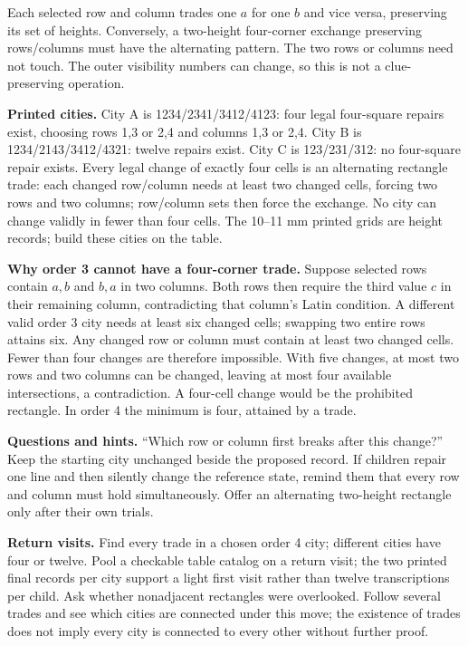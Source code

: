 \documentclass[11pt]{article}
\begin{document}
Each selected row and column trades one $a $ for one $b $ and vice versa, preserving its set of heights. Conversely, a two-height four-corner exchange preserving rows/columns must have the alternating pattern. The two rows or columns need not touch. The outer visibility numbers can change, so this is not a clue-preserving operation.

\textbf{Printed cities.} City A is 1234/2341/3412/4123: four legal four-square repairs exist, choosing rows 1,3 or 2,4 and columns 1,3 or 2,4. City B is 1234/2143/3412/4321: twelve repairs exist. City C is 123/231/312: no four-square repair exists. Every legal change of exactly four cells is an alternating rectangle trade: each changed row/column needs at least two changed cells, forcing two rows and two columns; row/column sets then force the exchange. No city can change validly in fewer than four cells. The 10--11 mm printed grids are height records; build these cities on the table.

\textbf{Why order 3 cannot have a four-corner trade.} Suppose selected rows contain $a,b $ and $b,a $ in two columns. Both rows then require the third value $c $ in their remaining column, contradicting that column's Latin condition. A different valid order 3 city needs at least six changed cells; swapping two entire rows attains six. Any changed row or column must contain at least two changed cells. Fewer than four changes are therefore impossible. With five changes, at most two rows and two columns can be changed, leaving at most four available intersections, a contradiction. A four-cell change would be the prohibited rectangle. In order 4 the minimum is four, attained by a trade.

\textbf{Questions and hints.} ``Which row or column first breaks after this change?'' Keep the starting city unchanged beside the proposed record. If children repair one line and then silently change the reference state, remind them that every row and column must hold simultaneously. Offer an alternating two-height rectangle only after their own trials.

\textbf{Return visits.} Find every trade in a chosen order 4 city; different cities have four or twelve. Pool a checkable table catalog on a return visit; the two printed final records per city support a light first visit rather than twelve transcriptions per child. Ask whether nonadjacent rectangles were overlooked. Follow several trades and see which cities are connected under this move; the existence of trades does not imply every city is connected to every other without further proof.
\end{document}
